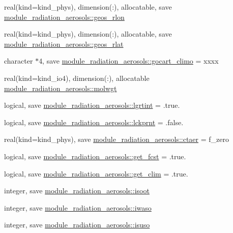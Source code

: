 \begin{DoxyCompactItemize}
\item 
real(kind=kind\+\_\+phys), dimension(\+:), allocatable, save \hyperlink{group__module__radiation__aerosols_ga1a0e35ab33517e765898870b8b1ab1ad}{module\+\_\+radiation\+\_\+aerosols\+::geos\+\_\+rlon}
\item 
real(kind=kind\+\_\+phys), dimension(\+:), allocatable, save \hyperlink{group__module__radiation__aerosols_gaef43bfbd28ef9b87e8d6973ba7331a18}{module\+\_\+radiation\+\_\+aerosols\+::geos\+\_\+rlat}
\item 
character $\ast$4, save \hyperlink{group__module__radiation__aerosols_gab8118108e60a4795a8caa5af71232399}{module\+\_\+radiation\+\_\+aerosols\+::gocart\+\_\+climo} = \textquotesingle{}xxxx\textquotesingle{}
\item 
real(kind=kind\+\_\+io4), dimension(\+:), allocatable \hyperlink{group__module__radiation__aerosols_ga166e63abaa518ec795f8eea6d115f03c}{module\+\_\+radiation\+\_\+aerosols\+::molwgt}
\item 
logical, save \hyperlink{group__module__radiation__aerosols_gaa27bf6912bfd67b78381892d4f555c51}{module\+\_\+radiation\+\_\+aerosols\+::lgrtint} = .true.
\item 
logical, save \hyperlink{group__module__radiation__aerosols_ga018d5414597049069c1ddd1094285371}{module\+\_\+radiation\+\_\+aerosols\+::lckprnt} = .false.
\item 
real(kind=kind\+\_\+phys), save \hyperlink{group__module__radiation__aerosols_ga4b0aa142aee31c40361dadc390ccc68e}{module\+\_\+radiation\+\_\+aerosols\+::ctaer} = f\+\_\+zero
\item 
logical, save \hyperlink{group__module__radiation__aerosols_ga36f851e49de5e1f7da38da5fa6ea445c}{module\+\_\+radiation\+\_\+aerosols\+::get\+\_\+fcst} = .true.
\item 
logical, save \hyperlink{group__module__radiation__aerosols_ga7fe1943010fe47c9d86ef4c993848459}{module\+\_\+radiation\+\_\+aerosols\+::get\+\_\+clim} = .true.
\item 
integer, save \hyperlink{group__module__radiation__aerosols_gaa9aa876f65d1e1e971607bff4ffbddad}{module\+\_\+radiation\+\_\+aerosols\+::isoot}
\item 
integer, save \hyperlink{group__module__radiation__aerosols_gad15292f4a185c28ad44687d95ef4d3a4}{module\+\_\+radiation\+\_\+aerosols\+::iwaso}
\item 
integer, save \hyperlink{group__module__radiation__aerosols_gacddb4dccea82201fd3b193c15c85ec78}{module\+\_\+radiation\+\_\+aerosols\+::isuso}
\item 

\end{DoxyCompactItemize}

